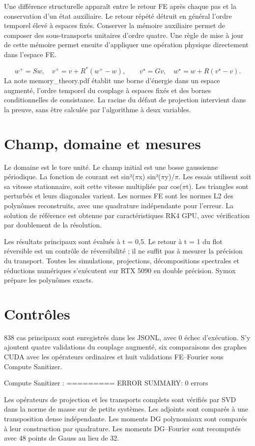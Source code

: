 \documentclass[10pt,a4paper]{article}
\begin{document}
Une différence structurelle apparaît entre le retour FE après chaque pas et la conservation d'un état auxiliaire. Le retour répété détruit en général l'ordre temporel élevé à espaces fixés. Conserver la mémoire auxiliaire permet de composer des sous-transports unitaires d'ordre quatre. Une règle de mise à jour de cette mémoire permet ensuite d'appliquer une opération physique directement dans l'espace FE.

\[w^+=Sw,\quad v^+=v+R^*(w^+-w),\qquad v^\star=Gv,\quad w^\star=w+R(v^\star-v).\]
La note memory\_theory.pdf établit une borne d'énergie dans un espace augmenté, l'ordre temporel du couplage à espaces fixés et des bornes conditionnelles de consistance. La racine du défaut de projection intervient dans la preuve, sans être calculée par l'algorithme à deux variables.

\section{Champ, domaine et mesures}
Le domaine est le tore unité. Le champ initial est une bosse gaussienne périodique. La fonction de courant est sin²(\(\pi\)x) sin²(\(\pi\)y)/\(\pi\). Les essais utilisent soit sa vitesse stationnaire, soit cette vitesse multipliée par cos(\(\pi\)t). Les triangles sont perturbés et leurs diagonales varient. Les normes FE sont les normes L2 des polynômes reconstruits, avec une quadrature indépendante pour l'erreur. La solution de référence est obtenue par caractéristiques RK4 GPU, avec vérification par doublement de la résolution.

Les résultats principaux sont évalués à t = 0,5. Le retour à t = 1 du flot réversible est un contrôle de réversibilité ; il ne suffit pas à mesurer la précision du transport. Toutes les simulations, projections, décompositions spectrales et réductions numériques s'exécutent sur RTX 5090 en double précision. Symox prépare les polynômes exacts.

\section{Contrôles}
838 cas principaux sont enregistrés dans les JSONL, avec 0 échec d'exécution. S'y ajoutent quatre validations du couplage augmenté, six comparaisons des graphes CUDA avec les opérateurs ordinaires et huit validations FE–Fourier sous Compute Sanitizer.

Compute Sanitizer : ========= ERROR SUMMARY: 0 errors

Les opérateurs de projection et les transports complets sont vérifiés par SVD dans la norme de masse sur de petits systèmes. Les adjoints sont comparés à une transposition dense indépendante. Les moments DG polynomiaux sont comparés à leur construction par quadrature. Les moments DG–Fourier sont recomputés avec 48 points de Gauss au lieu de 32.
\end{document}
